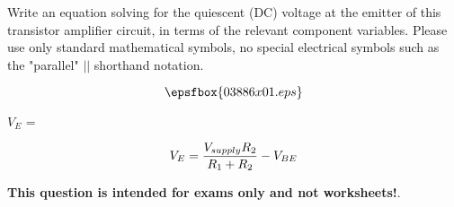 

Write an equation solving for the quiescent (DC) voltage at the emitter of this transistor amplifier circuit, in terms of the relevant component variables.  Please use only standard mathematical symbols, no special electrical symbols such as the "parallel" $||$ shorthand notation.

$$\epsfbox{03886x01.eps}$$

$V_E$ = 







$$V_E = {{V_{supply} R_2} \over {R_1 + R_2}} - V_{BE}$$







{\bf This question is intended for exams only and not worksheets!}.



